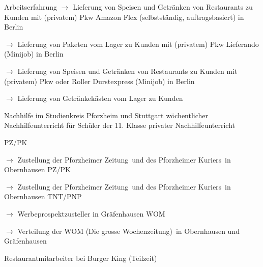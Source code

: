 \begin{rubric}{\textcolor{black!20!blue!100}{Arbeitserfahrung}}
			\setlength{\hangindent}{\widthof{$\rightarrow$ }}
			$\rightarrow$ Lieferung von Speisen und Getränken von Restaurants zu Kunden mit (privatem) Pkw
		\entry*[09/11/2020 --- 06/2022]
			Amazon Flex (selbstständig, auftragsbasiert) in Berlin
			
			\setlength{\hangindent}{\widthof{$\rightarrow$ }}
			$\rightarrow$ Lieferung von Paketen vom Lager zu Kunden mit (privatem) Pkw
		\entry*[24/10/2020 --- 04/01/2021]
			Lieferando (Minijob) in Berlin
			
			\setlength{\hangindent}{\widthof{$\rightarrow$ }}
			$\rightarrow$ Lieferung von Speisen und Getränken von Restaurants zu Kunden mit (privatem) Pkw oder Roller
		\entry*[17/07/2020 --- 18/10/2020]
			Durstexpress (Minijob) in Berlin
			
			\setlength{\hangindent}{\widthof{$\rightarrow$ }}
			$\rightarrow$ Lieferung von Getränkekästen vom Lager zu Kunden
				
		\entry*[10/2015 --- 01/2016]
			Nachhilfe im Studienkreis Pforzheim und Stuttgart
		\entry*[10/2011 --- 06/2012]
			wöchentlicher Nachhilfeunterricht für Schüler der 11. Klasse
		\entry*[\phantom{10/}2010 --- 2016]
			privater Nachhilfeunterricht
			
		\entry*[08/2015 --- 09/2015]
			PZ/PK
			
			\setlength{\hangindent}{\widthof{$\rightarrow$ }}
			$\rightarrow$ Zustellung der \glqq Pforzheimer Zeitung\grqq\ und des \glqq Pforzheimer Kuriers\grqq\ in Obernhausen
		\entry*[08/2012 --- 09/2012]
			PZ/PK
			
			\setlength{\hangindent}{\widthof{$\rightarrow$ }}
			$\rightarrow$ Zustellung der \glqq Pforzheimer Zeitung\grqq\ und des \glqq Pforzheimer Kuriers\grqq\ in Obernhausen
		\entry*[06/2009 --- 10/2010]
			TNT/PNP
			
			\setlength{\hangindent}{\widthof{$\rightarrow$ }}
			$\rightarrow$ Werbeprospektzusteller in Gräfenhausen
		\entry*[06/2007 --- 12/2008]
			WOM
			
			\setlength{\hangindent}{\widthof{$\rightarrow$ }}
			$\rightarrow$ Verteilung der \glqq WOM (Die grosse Wochenzeitung)\grqq\ in Obernhausen und Gräfenhausen
			
		\entry*[04/2012 --- 10/2012]
			Restaurantmitarbeiter bei Burger King (Teilzeit)
\end{rubric}